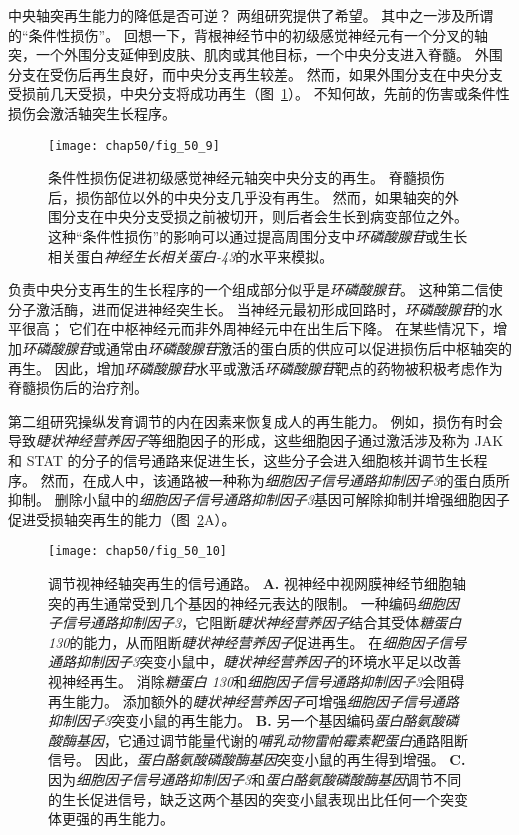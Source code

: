 中央轴突再生能力的降低是否可逆？
两组研究提供了希望。
其中之一涉及所谓的“条件性损伤”。
回想一下，背根神经节中的初级感觉神经元有一个分叉的轴突，一个外围分支延伸到皮肤、肌肉或其他目标，一个中央分支进入脊髓。
外围分支在受伤后再生良好，而中央分支再生较差。
然而，如果外围分支在中央分支受损前几天受损，中央分支将成功再生（图~\ref{fig:50_9}）。
不知何故，先前的伤害或条件性损伤会激活轴突生长程序。


\begin{figure}[htbp]
	\centering
	\texttt{[image: chap50/fig\_50\_9]}
	\caption{条件性损伤促进初级感觉神经元轴突中央分支的再生。
		脊髓损伤后，损伤部位以外的中央分支几乎没有再生。
		然而，如果轴突的外围分支在中央分支受损之前被切开，则后者会生长到病变部位之外。
		这种“条件性损伤”的影响可以通过提高周围分支中\textit{环磷酸腺苷}或生长相关蛋白\textit{神经生长相关蛋白-43}的水平来模拟。}
	\label{fig:50_9}
\end{figure}


负责中央分支再生的生长程序的一个组成部分似乎是\textit{环磷酸腺苷}。
这种第二信使分子激活酶，进而促进神经突生长。
当神经元最初形成回路时，\textit{环磷酸腺苷}的水平很高；
它们在中枢神经元而非外周神经元中在出生后下降。
在某些情况下，增加\textit{环磷酸腺苷}或通常由\textit{环磷酸腺苷}激活的蛋白质的供应可以促进损伤后中枢轴突的再生。
因此，增加\textit{环磷酸腺苷}水平或激活\textit{环磷酸腺苷}靶点的药物被积极考虑作为脊髓损伤后的治疗剂。


第二组研究操纵发育调节的内在因素来恢复成人的再生能力。
例如，损伤有时会导致\textit{睫状神经营养因子}等细胞因子的形成，这些细胞因子通过激活涉及称为 JAK 和 STAT 的分子的信号通路来促进生长，这些分子会进入细胞核并调节生长程序。
然而，在成人中，该通路被一种称为\textit{细胞因子信号通路抑制因子3}的蛋白质所抑制。
删除小鼠中的\textit{细胞因子信号通路抑制因子3}基因可解除抑制并增强细胞因子促进受损轴突再生的能力（图~\ref{fig:50_10}A）。


\begin{figure}[htbp]
	\centering
	\texttt{[image: chap50/fig\_50\_10]}
	\caption{调节视神经轴突再生的信号通路。
		\textbf{A.} 视神经中视网膜神经节细胞轴突的再生通常受到几个基因的神经元表达的限制。
		一种编码\textit{细胞因子信号通路抑制因子3}，它阻断\textit{睫状神经营养因子}结合其受体\textit{糖蛋白 130}的能力，从而阻断\textit{睫状神经营养因子}促进再生。
		在\textit{细胞因子信号通路抑制因子3}突变小鼠中，\textit{睫状神经营养因子}的环境水平足以改善视神经再生。
		消除\textit{糖蛋白 130}和\textit{细胞因子信号通路抑制因子3}会阻碍再生能力。
		添加额外的\textit{睫状神经营养因子}可增强\textit{细胞因子信号通路抑制因子3}突变小鼠的再生能力。
		\textbf{B.} 另一个基因编码\textit{蛋白酪氨酸磷酸酶基因}，它通过调节能量代谢的\textit{哺乳动物雷帕霉素靶蛋白}通路阻断信号。
		因此，\textit{蛋白酪氨酸磷酸酶基因}突变小鼠的再生得到增强。
		\textbf{C.} 因为\textit{细胞因子信号通路抑制因子3}和\textit{蛋白酪氨酸磷酸酶基因}调节不同的生长促进信号，缺乏这两个基因的突变小鼠表现出比任何一个突变体更强的再生能力\cite{smith2009socs3}。}
	\label{fig:50_10}
\end{figure}


